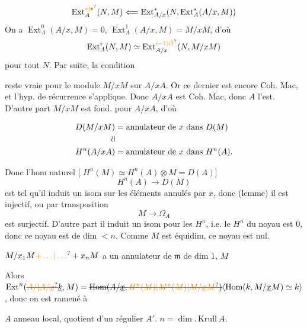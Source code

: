 \[
 \operatorname{Ext}_{A}^{\unsure{*|\bullet}}(N,M)\Longleftarrow
 \operatorname{Ext}_{A/x}^{*}(N,\operatorname{Ext}_{A}^{*}(A/x,M))
\]
On a $\operatorname{Ext}_{A}^{0}(A/x,M)=0$, $\operatorname{Ext}_{A}^{1}(A/x,M)=M/xM$, d'où
\[
 \operatorname{Ext}_{A}^{i}(N,M)\simeq\operatorname{Ext}_{A/x}^{\unsure{i-1|i1}}(N,M/xM)
\]
pour tout $N$. Par suite, la condition 

reste vraie pour le module $M/xM$ sur $A/xA$. Or ce dernier est encore Coh. Mac, et l'hyp. de récurrence s'applique. Donc  $A/xA$ est Coh. Mac, donc $A$ l'est. D'autre part $M/xM$  est fond. pour $A/xA$, d'où

\[
\begin{aligned}
 D(M/xM)&=\text{annulateur de }x\text{ dans }D(M)\\
 \rotatebox{90}{$\simeq$}&\\
 H^{n}(A/xA)&=\text{annulateur de }x\text{ dans }H^n(A).
\end{aligned}
\]

Donc l'hom naturel [ $H^n(M)\simeq H^n(A)\otimes M=D(A)$]
\[
 H^n(A)\longrightarrow D(M)
\]
est tel qu'il induit un isom sur les éléments annulés par $x$, donc (lemme) il est injectif, ou par transposition
\[
 M\to\Omega_A
\]
est surjectif. D'autre part il induit un isom pour les $H^n$, i.e. le $H^n$ du noyau est $0$, donc ce noyau est de dim $<n$. Comme $M$ est équidim, ce noyau est nul.


    $M/x_1M\unsure{+\ldots|\ldots}+x_nM$ a un annulateur de $\mathfrak m$ de dim $1$, $M$  

 Alors  $\operatorname{Ext}^{n}(\deleted{\unsure{A/|A/\underline{x}}}\underline{k},M)=\deleted{\operatorname{Hom}(A/\underline{x},\unsure{H^{n}(M)|M^{n}(M)|M/\underline{x}M})}\inserted{\operatorname{Hom}(k,M/\underline xM)\simeq k}$, donc on est ramené à 

$A$ anneau local, quotient d'un régulier $A'$. $n=\dim.\,\mathrm{Krull}\ A$.

